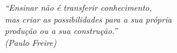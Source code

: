 \begin{epigrafe}
    \vspace*{\fill}
	\begin{flushright}
		\textit{``Ensinar não é transferir conhecimento, \\
		mas criar as possibilidades para a sua própria \\
		produção ou a sua construção.''\\
		(Paulo Freire)}
	\end{flushright}
\end{epigrafe}